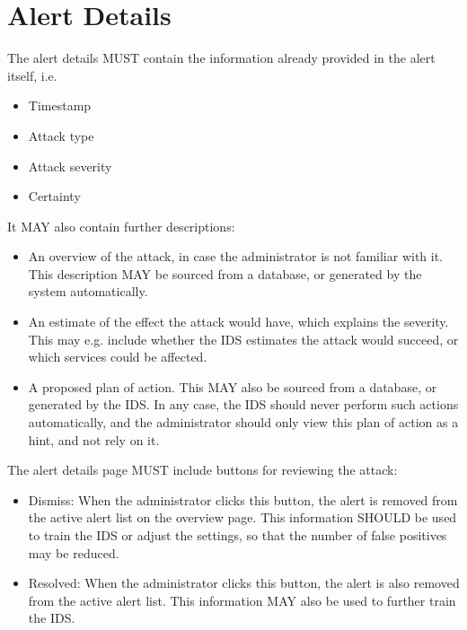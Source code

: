 \documentclass[oneside, english]{reports/assets/sdqtechreport}
\begin{document}
\section{Alert Details}
\label{sec:UserInterfaceAlertDetails}

The alert details MUST contain the information already provided in the alert
itself, i.e.

\begin{itemize}
	\item Timestamp
	\item Attack type
	\item Attack severity
	\item Certainty
\end{itemize}

It MAY also contain further descriptions:

\begin{itemize}
	\item An overview of the attack, in case the administrator is not familiar with it.
	      This description MAY be sourced from a database, or generated by the system
	      automatically.
	\item An estimate of the effect the attack would have, which explains the severity.
	      This may e.g. include whether the IDS estimates the attack would succeed, or
	      which services could be affected.
	\item A proposed plan of action. This MAY also be sourced from a database, or
	      generated by the IDS. In any case, the IDS should never perform such actions
	      automatically, and the administrator should only view this plan of action as a
	      hint, and not rely on it.
\end{itemize}

The alert details page MUST include buttons for reviewing the attack:

\begin{itemize}
	\item Dismiss: When the administrator clicks this button, the alert is removed from
	      the active alert list on the overview page. This information SHOULD be used to
	      train the IDS or adjust the settings, so that the number of false positives may
	      be reduced.
	\item Resolved: When the administrator clicks this button, the alert is also removed
	      from the active alert list. This information MAY also be used to further train
	      the IDS.
\end{itemize}
\end{document}
